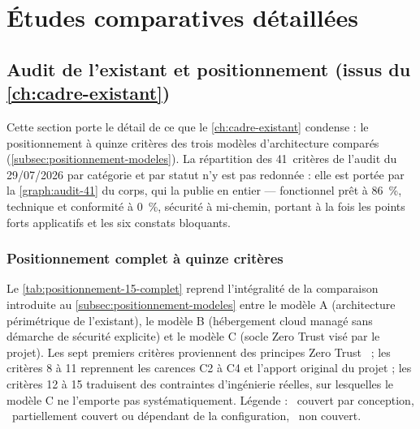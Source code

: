\chapter{Études comparatives détaillées}
\label{ann:etudes-comparatives}

\setlength{\textfloatsep}{10pt plus 2pt minus 2pt}
\setlength{\intextsep}{8pt plus 2pt minus 2pt}
\setlength{\floatsep}{8pt plus 2pt minus 2pt}


\section{Audit de l'existant et positionnement (issus du \cref{ch:cadre-existant})}
\label{ann:etudes-comparatives-ch1}

Cette section porte le détail de ce que le \cref{ch:cadre-existant} condense : le
positionnement à quinze critères des trois modèles d'architecture comparés
(\cref{subsec:positionnement-modeles}). La répartition des 41~critères de l'audit du
29/07/2026 par catégorie et par statut n'y est pas redonnée : elle est portée par la
\cref{graph:audit-41} du corps, qui la publie en entier --- fonctionnel prêt à 86~\%, technique
et conformité à 0~\%, sécurité à mi-chemin, portant à la fois les points forts applicatifs et
les six constats bloquants.

\subsection{Positionnement complet à quinze critères}

Le \cref{tab:positionnement-15-complet} reprend l'intégralité de la comparaison introduite au
\cref{subsec:positionnement-modeles} entre le modèle A (architecture périmétrique de l'existant),
le modèle B (hébergement cloud managé sans démarche de sécurité explicite) et le modèle C (socle
Zero Trust visé par le projet). Les sept premiers critères proviennent des principes Zero
Trust~\cite{nist800207} ; les critères 8 à 11 reprennent les carences C2 à C4 et l'apport original
du projet ; les critères 12 à 15 traduisent des contraintes d'ingénierie réelles, sur lesquelles le
modèle C ne l'emporte pas systématiquement. Légende : \pictoPleinAudit~couvert par conception,
\pictoPartielAudit~partiellement couvert ou dépendant de la configuration,
\pictoVideAudit~non couvert.

